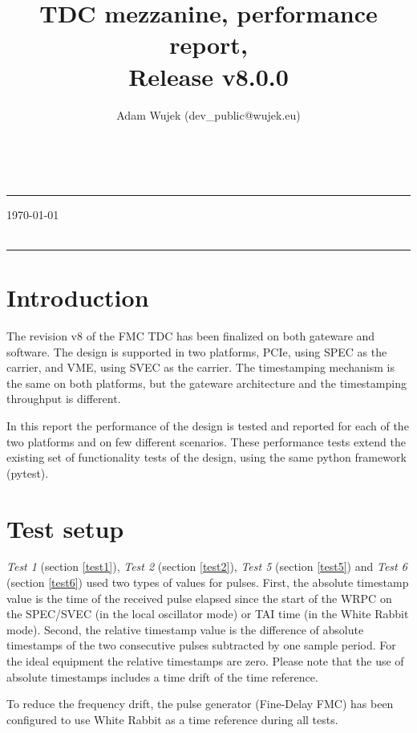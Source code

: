 \documentclass[a4paper, 12pt]{article}
\title{TDC mezzanine, performance report,\\ Release v8.0.0}
\author{Adam Wujek (dev\_public@wujek.eu)\hfill}
\begin{document}
\makeatletter
{}
\raggedright
{\LARGE\bf\@title}\\[0.2 cm]
\hrule height 4pt \vspace{0.1cm}
{\large\hfill\today}\\
\vspace*{\fill}
{\large\@author}\\
\hrule height 2pt
\justify
\makeatother

\newpage

\tableofcontents

\newpage

\section{Introduction}
The revision v8\cite{tdc.release} of the FMC TDC\cite{tdc} has been finalized
on both gateware and software. The design
is supported in two platforms, PCIe, using SPEC\cite{SPEC} as the carrier,
and VME, using SVEC\cite{SVEC} as the carrier. The timestamping mechanism is
the same on both platforms, but the gateware architecture and
the timestamping throughput is different.

In this report the performance of the design is tested and reported for each
of the two platforms and on few different scenarios. These performance tests
extend the existing set of functionality tests of the design,
using the same python framework (pytest\cite{pytest}).

\section{Test setup}
\textit{Test 1} (section \ref{test1}), \textit{Test 2} (section \ref{test2}),
\textit{Test 5} (section \ref{test5}) and \textit{Test 6} (section \ref{test6})
used two types of values for pulses.
First, the absolute timestamp value is the time of the received pulse elapsed
since the start of the WRPC on the SPEC/SVEC (in the local oscillator mode)
or TAI time (in the White Rabbit mode).
Second, the relative timestamp value is the difference of absolute timestamps
of the two consecutive pulses subtracted by one sample period. For the ideal
equipment the relative timestamps are zero.
Please note that the use of absolute timestamps includes a time drift of
the time reference.

To reduce the frequency drift, the pulse generator (Fine-Delay FMC)
has been configured to use White Rabbit as a time reference during all tests.
\end{document}
